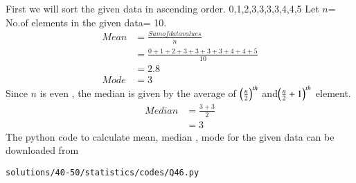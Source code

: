  First we will sort the given data in ascending order.  
 0,1,2,3,3,3,3,4,4,5
 Let $n$= No.of elements in the given data= 10.
\begin{align}
Mean &= \frac{Sum of data values}{n}\\
&= \frac{0+1+2+3+3+3+3+4+4+5}{10}\\
&= 2.8\\
Mode &= 3
\end{align}
 Since $n$ is even , the median is given by the average of $\left(\frac{n}{2}\right)^{th}$ and$\left(\frac{n}{2}+1\right)^{th}$ element.
\begin{align}
Median &= \frac{3+3}{2}\\
&= 3
\end{align} 
 The python code to calculate mean, median , mode for the given data can be downloaded from 
\begin{lstlisting}
solutions/40-50/statistics/codes/Q46.py
\end{lstlisting}

